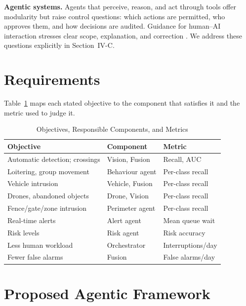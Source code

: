 \documentclass[conference]{IEEEtran}
\begin{document}
\textbf{Agentic systems.} Agents that perceive, reason, and act through tools \cite{wooldridge1995,yao2023,wang2024} offer modularity but raise control questions: which actions are permitted, who approves them, and how decisions are audited. Guidance for human--AI interaction stresses clear scope, explanation, and correction \cite{amershi2019}. We address these questions explicitly in Section~IV-C.

\section{Requirements}
Table~\ref{tab:req} maps each stated objective to the component that satisfies it and the metric used to judge it.
\begin{table}[!t]
\caption{Objectives, Responsible Components, and Metrics}\label{tab:req}
\centering\footnotesize
\begin{tabular}{p{2.55cm}p{2.7cm}p{2.2cm}}
\toprule
\textbf{Objective} & \textbf{Component} & \textbf{Metric}\\
\midrule
Automatic detection; crossings & Vision, Fusion & Recall, AUC\\
Loitering, group movement & Behaviour agent & Per-class recall\\
Vehicle intrusion & Vehicle, Fusion & Per-class recall\\
Drones, abandoned objects & Drone, Vision & Per-class recall\\
Fence/gate/zone intrusion & Perimeter agent & Per-class recall\\
Real-time alerts & Alert agent & Mean queue wait\\
Risk levels & Risk agent & Risk accuracy\\
Less human workload & Orchestrator & Interruptions/day\\
Fewer false alarms & Fusion & False alarms/day\\
\bottomrule
\end{tabular}
\end{table}

\section{Proposed Agentic Framework}
\end{document}
